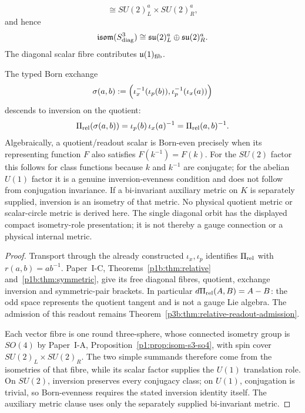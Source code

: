 \documentclass[12pt,a4paper]{article}
\begin{document}
\begin{theorem}
\begin{enumerate}[label=(\roman*),leftmargin=2.2em]
\[        \cong SU(2)^a_L\times SU(2)^a_R,
\]
and hence
\[
        \mathfrak{isom}(S^3_{\rm diag})
        \cong
        \mathfrak{su}(2)^a_L\oplus\mathfrak{su}(2)^a_R.
\]
The diagonal scalar fibre contributes \(\mathfrak u(1)_{\rm fib}\).
\end{enumerate}
The typed Born exchange
\[
 \sigma(a,b)
 :=\Bigl(\iota_x^{-1}(\iota_p(b)),
          \iota_p^{-1}(\iota_x(a))\Bigr)
\]
descends to inversion on the quotient:
\[
 \Pi_{\rm rel}(\sigma(a,b))
 =\iota_p(b)\,\iota_x(a)^{-1}
 =\Pi_{\rm rel}(a,b)^{-1}.
\]
Algebraically, a quotient/readout scalar is Born-even precisely when
its representing function \(F\) also satisfies \(F(k^{-1})=F(k)\).
For the \(SU(2)\) factor this follows for class functions because \(k\) and
\(k^{-1}\) are conjugate; for the abelian \(U(1)\) factor it is a genuine
inversion-evenness condition and does not follow from conjugation invariance.
If a bi-invariant auxiliary metric on \(K\) is separately supplied, inversion
is an isometry of that metric.  No physical quotient metric or scalar-circle
metric is derived here.  The single diagonal orbit has the displayed compact
isometry-role presentation; it is not thereby a gauge connection or a
physical internal metric.
\end{theorem}

\begin{proof}
Transport through the already constructed \(\iota_x,\iota_p\) identifies
\(\Pi_{\rm rel}\) with \(r(a,b)=ab^{-1}\).  Paper~I-C,
Theorems~\ref{p1b:thm:relative} and~\ref{p1b:thm:symmetric}, give its free
diagonal fibres, quotient, exchange inversion and symmetric-pair brackets.
In particular \(d\Pi_{\rm rel}(A,B)=A-B\): the odd space represents the
quotient tangent and is not a gauge Lie algebra.  The admission of this
readout remains Theorem~\ref{p3b:thm:relative-readout-admission}.

Each vector fibre is one round three-sphere, whose connected isometry group
is \(SO(4)\) by Paper~I-A, Proposition~\ref{p1:prop:isom-s3-so4}, with spin
cover \(SU(2)_L\times SU(2)_R\).  The two simple summands therefore come
from the isometries of that fibre, while its scalar factor supplies the
\(U(1)\) translation role.  On \(SU(2)\), inversion preserves every
conjugacy class; on \(U(1)\), conjugation is trivial, so Born-evenness
requires the stated inversion identity itself.  The auxiliary metric clause
uses only the separately supplied bi-invariant metric.
\end{proof}
\end{document}

